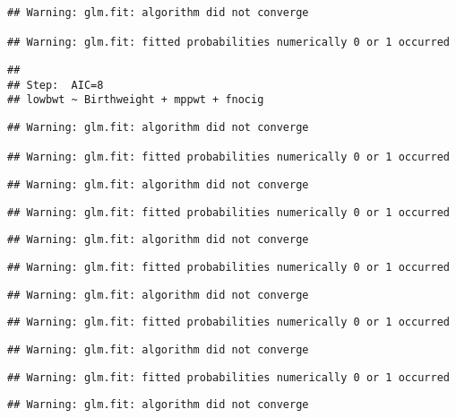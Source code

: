 \documentclass[]{article}
\begin{document}
\begin{verbatim}
## Warning: glm.fit: algorithm did not converge

## Warning: glm.fit: fitted probabilities numerically 0 or 1 occurred
\end{verbatim}

\begin{verbatim}
## 
## Step:  AIC=8
## lowbwt ~ Birthweight + mppwt + fnocig
\end{verbatim}

\begin{verbatim}
## Warning: glm.fit: algorithm did not converge

## Warning: glm.fit: fitted probabilities numerically 0 or 1 occurred
\end{verbatim}

\begin{verbatim}
## Warning: glm.fit: algorithm did not converge
\end{verbatim}

\begin{verbatim}
## Warning: glm.fit: fitted probabilities numerically 0 or 1 occurred
\end{verbatim}

\begin{verbatim}
## Warning: glm.fit: algorithm did not converge
\end{verbatim}

\begin{verbatim}
## Warning: glm.fit: fitted probabilities numerically 0 or 1 occurred
\end{verbatim}

\begin{verbatim}
## Warning: glm.fit: algorithm did not converge
\end{verbatim}

\begin{verbatim}
## Warning: glm.fit: fitted probabilities numerically 0 or 1 occurred
\end{verbatim}

\begin{verbatim}
## Warning: glm.fit: algorithm did not converge
\end{verbatim}

\begin{verbatim}
## Warning: glm.fit: fitted probabilities numerically 0 or 1 occurred
\end{verbatim}

\begin{verbatim}
## Warning: glm.fit: algorithm did not converge
\end{verbatim}
\end{document}
